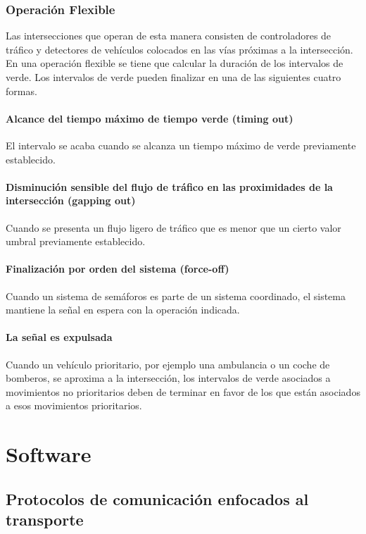 \subsubsection{Operación Flexible}
Las intersecciones que operan de esta manera consisten de controladores de tráfico y detectores de vehículos 
colocados en las vías próximas a la intersección. En una operación flexible se tiene que calcular la duración 
de los intervalos de verde. Los intervalos de verde pueden finalizar en una de las siguientes cuatro formas\cite{8}.
\paragraph{Alcance del tiempo máximo de tiempo verde (timing out)}
El intervalo se acaba cuando se alcanza un tiempo máximo de verde previamente establecido\cite{8}.
\paragraph{Disminución sensible del flujo de tráfico en las proximidades de la intersección (gapping out)}
Cuando se presenta un flujo ligero de tráfico que es menor que un cierto valor umbral previamente establecido\cite{8}.
\paragraph{Finalización por orden del sistema (force-off)}
Cuando un sistema de semáforos es parte de un sistema coordinado, el sistema mantiene la señal en espera con la 
operación indicada\cite{8}.
\paragraph{La señal es expulsada}
Cuando un vehículo prioritario, por ejemplo una ambulancia o un coche de bomberos, se aproxima a la intersección, 
los intervalos de verde asociados a movimientos no prioritarios deben de terminar en favor de los que están asociados 
a esos movimientos prioritarios\cite{8}.

\section{Software}
\subsection{Protocolos de comunicación enfocados al transporte}
